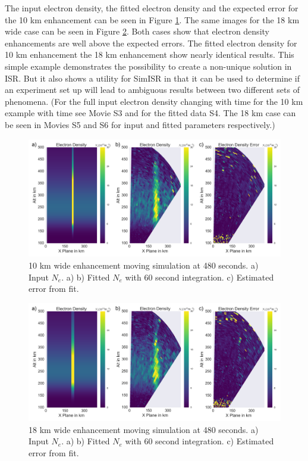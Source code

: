 \documentclass[draft,ras]{agutex}
\begin{document}
\begin{article}
The input electron density, the fitted electron density and the expected error for the 10 km enhancement can be seen in Figure \ref{fig:moving10all}. The same images for the 18 km wide case can be seen in Figure \ref{fig:moving18all}. Both cases show that electron density enhancements are well above the expected errors. The fitted electron density for 10 km enhancement the 18 km enhancement show nearly identical results. This simple example demonstrates the possibility to create a non-unique solution in ISR. But it also shows a utility for SimISR in that it can be used to determine if an experiment set up will lead to ambiguous results between two different sets of phenomena. (For the full input electron density changing with time for the 10 km example with time see Movie S3 and for the fitted data S4. The 18 km case can be seen in Movies S5 and S6 for input and fitted parameters respectively.)

\begin{figure}[!t]
\centering
\includegraphics[width=6in]{moving10kminouterr}
\caption{10 km wide enhancement moving simulation at 480 seconds. a) Input $N_e$. a)  b) Fitted $N_e$ with 60 second integration. c) Estimated error from fit.}
\label{fig:moving10all}
\end{figure}

\begin{figure}[!t]
\centering
\includegraphics[width=6in]{moving18kminouterr}
\caption{18 km wide enhancement moving simulation at 480 seconds. a) Input $N_e$. a)  b) Fitted $N_e$ with 60 second integration. c) Estimated error from fit.}
\label{fig:moving18all}
\end{figure}


\end{article}
\end{document}
